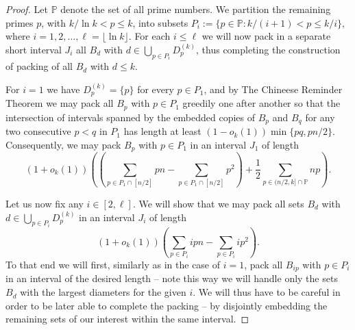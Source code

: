 \documentclass[12pt]{amsart}
\theoremstyle{plain}
\numberwithin{equation}{section}
\begin{document}
\begin{proof}
		Let $\mathbb{P}$ denote the set of all prime numbers. We partition the remaining primes $p$, with $k/\ln k<p\leqslant k$, into subsets $P_i:=\{p\in \mathbb{P}: k/(i+1)<p\leqslant k/i\}$, where $i=1,2,\ldots,\ell=\lfloor \ln k \rfloor$. For each $i\leqslant\ell$ we will now pack in a separate short interval $J_i$ all $B_d$ with $d\in\bigcup_{p\in P_i} D_p^{(k)}$, thus completing the construction of packing of all $B_d$ with $d\leqslant k$.
		
		For $i=1$ we have $D_p^{(k)}=\{p\}$ for every $p\in P_1$, and by The Chineese Reminder Theorem we may pack all $B_p$ with $p\in P_1$ greedily one after another so that the intersection of intervals spanned by the embedded copies of $B_p$ and $B_q$ for any two consecutive $p<q$ in $P_1$ has length at least $(1-o_k(1))\min\{pq,pn/2\}$. Consequently, we may pack $B_p$ with $p\in P_1$ in an interval $J_1$ of length
		\begin{equation}\label{J1}
		(1+o_k(1))\left(\left(\sum_{p\in P_1\cap [n/2]} pn - \sum_{p\in P_1\cap[n/2]}p^2\right)
		+\frac{1}{2}\sum_{p\in(n/2,k]\cap\mathbb{P}}np\right).
		\end{equation}

		
		Let us now fix any $i\in[2, \ell]$. We will show that  
		we may pack all sets $B_d$ with $d\in\bigcup_{p\in P_i} D_p^{(k)}$ in an interval $J_i$ of length 
			\begin{equation}\label{Ji}
			(1+o_k(1))\left(\sum_{p\in P_i} ipn - \sum_{p\in P_i}ip^2\right).
			\end{equation}
			To that end we will first, similarly as in the case of $i=1$, pack all $B_{ip}$ with $p\in P_i$ in an interval of the desired length -- note this way we will handle only the sets $B_d$ with the largest diameters for the given $i$. We will thus have to be careful 
			in order to be later able to
complete the packing -- 
by disjointly embedding 
the remaining sets of our interest within the same interval.


\end{proof}
\end{document}
